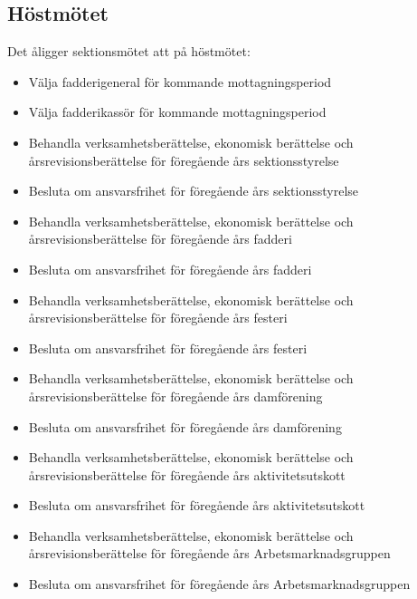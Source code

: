 \documentclass{datateknologsektionen-document}
\begin{document}
    \subsection{Höstmötet}
      Det åligger sektionsmötet att på höstmötet:
      \begin{itemize}
        \item Välja fadderigeneral för kommande mottagningsperiod
        \item Välja fadderikassör för kommande mottagningsperiod
        \item Behandla verksamhetsberättelse, ekonomisk berättelse och årsrevisionsberättelse för föregående års sektionsstyrelse
        \item Besluta om ansvarsfrihet för föregående års sektionsstyrelse
        \item Behandla verksamhetsberättelse, ekonomisk berättelse och årsrevisionsberättelse för föregående års fadderi
        \item Besluta om ansvarsfrihet för föregående års fadderi
        \item Behandla verksamhetsberättelse, ekonomisk berättelse och årsrevisionsberättelse för föregående års festeri
        \item Besluta om ansvarsfrihet för föregående års festeri
        \item Behandla verksamhetsberättelse, ekonomisk berättelse och årsrevisionsberättelse för föregående års damförening
        \item Besluta om ansvarsfrihet för föregående års damförening
        \item Behandla verksamhetsberättelse, ekonomisk berättelse och årsrevisionsberättelse för föregående års aktivitetsutskott
        \item Besluta om ansvarsfrihet för föregående års aktivitetsutskott
        \item Behandla verksamhetsberättelse, ekonomisk berättelse och årsrevisionsberättelse för föregående års Arbetsmarknadsgruppen
        \item Besluta om ansvarsfrihet för föregående års Arbetsmarknadsgruppen
      \end{itemize}
\end{document}
